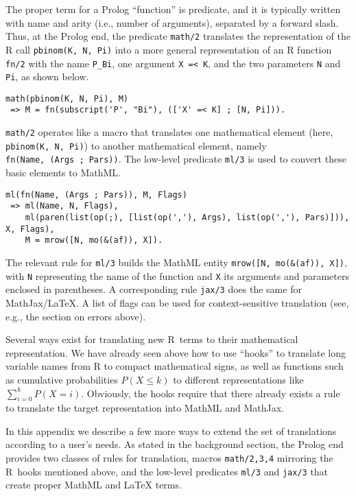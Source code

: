 The proper term for a Prolog ``function'' is predicate, and it is
typically written with name and arity (i.e., number of arguments),
separated by a forward slash. Thus, at the Prolog end, the predicate
\texttt{math/2} translates the representation of the R call \texttt{pbinom(K,~N,~Pi)}
into a more general representation of an R function \texttt{fn/2} with the name
\texttt{P\_Bi}, one argument \texttt{X~=\textless{}~K}, and the two parameters \texttt{N} and \texttt{Pi}, as
shown below.

\begin{verbatim}
math(pbinom(K, N, Pi), M)
 => M = fn(subscript('P', "Bi"), (['X' =< K] ; [N, Pi])).
\end{verbatim}

\texttt{math/2} operates like a macro that translates one mathematical element
(here, \texttt{pbinom(K,~N,~Pi)}) to another mathematical element, namely
\texttt{fn(Name,~(Args~;~Pars))}. The low-level predicate \texttt{ml/3} is used to
convert these basic elements to MathML.

\begin{verbatim}
ml(fn(Name, (Args ; Pars)), M, Flags)
 => ml(Name, N, Flags),
    ml(paren(list(op(;), [list(op(','), Args), list(op(','), Pars)])), X, Flags),
    M = mrow([N, mo(&(af)), X]).
\end{verbatim}

The relevant rule for \texttt{ml/3} builds the MathML entity
\texttt{mrow({[}N,\ mo(\&(af)),\ X{]})}, with \texttt{N} representing the name of the
function and \texttt{X} its arguments and parameters enclosed in parentheses. A
corresponding rule \texttt{jax/3} does the same for MathJax/LaTeX. A list of
flags can be used for context-sensitive translation (see, e.g., the
section on errors above).

Several ways exist for translating new R~terms to their mathematical
representation. We have already seen above how to use ``hooks'' to
translate long variable names from R to compact mathematical signs, as
well as functions such as cumulative probabilities \(P(X \le k)\) to
different representations like \(\sum_{i=0}^k P(X = i)\). Obviously, the
hooks require that there already exists a rule to translate the target
representation into MathML and MathJax.

In this appendix we describe a few more ways to extend the set of
translations according to a user's needs. As stated in the background
section, the Prolog end provides two classes of rules for translation,
macros \texttt{math/2,3,4} mirroring the R~hooks mentioned above, and the
low-level predicates \texttt{ml/3} and \texttt{jax/3} that create proper MathML and
LaTeX terms.

